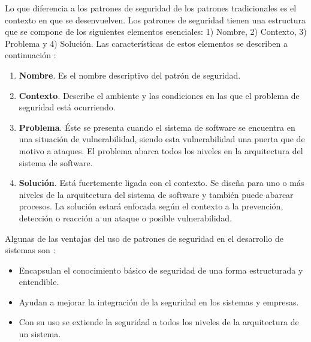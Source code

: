 \vspace{0.3cm}

Lo que diferencia a los patrones de seguridad de los patrones tradicionales es el contexto en que se desenvuelven. Los patrones de seguridad tienen una estructura que se compone de los siguientes elementos esenciales: 1) Nombre, 2) Contexto, 3) Problema y 4) Solución.  Las características de estos elementos se describen a continuación \cite{SchFerHyb06}:

\begin{enumerate}[noitemsep]
	\item \textbf{Nombre}. Es el nombre descriptivo del patrón de seguridad.
	\item \textbf{Contexto}. Describe el ambiente y las condiciones en las que el problema de seguridad está ocurriendo.
	\item \textbf{Problema}. Éste se presenta cuando el sistema de software se encuentra en una situación de vulnerabilidad, siendo esta vulnerabilidad una puerta que de motivo a ataques. El problema abarca todos los niveles en la arquitectura del sistema de software. 
	\item \textbf{Solución}. Está fuertemente ligada con el contexto. Se diseña para uno o más niveles de la arquitectura del sistema de software y también puede abarcar procesos. La solución estará enfocada según el contexto a la prevención, detección o reacción a un ataque o posible vulnerabilidad.
\end{enumerate}

Algunas de las ventajas del uso de patrones de seguridad en el desarrollo de sistemas son \cite{SchFerHyb06}:

\begin{itemize}[noitemsep]
	\item Encapsulan el conocimiento básico de seguridad de una forma estructurada y entendible. 
	\item Ayudan a mejorar la integración de la seguridad en los sistemas y empresas.
	\item Con su uso se extiende la seguridad a todos los niveles de la arquitectura de un sistema.
\end{itemize}

